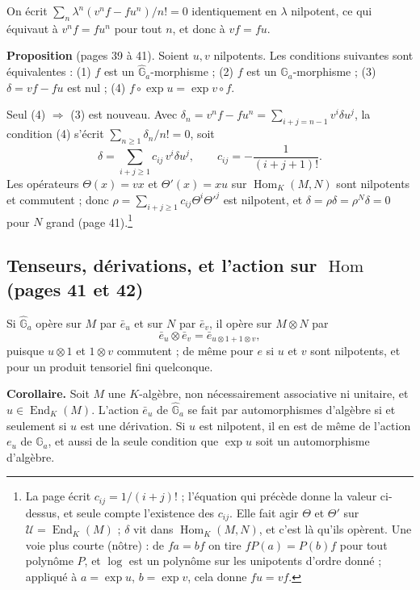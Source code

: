 \documentclass[11pt,a4paper]{article}
\begin{document}
On écrit $\sum_n \lambda^n (v^n f - f u^n)/n! = 0$ identiquement en
$\lambda$ nilpotent, ce qui équivaut à $v^n f = f u^n$ pour tout $n$, et donc
à $vf = fu$.

\textbf{Proposition} (pages 39 à 41). Soient $u, v$ nilpotents. Les
conditions suivantes sont équivalentes : (1) $f$ est un
$\widehat{\mathbb{G}}_a$-morphisme ; (2) $f$ est un
$\mathbb{G}_a$-morphisme ; (3) $\delta = vf - fu$ est nul ; (4)
$f \circ \exp u = \exp v \circ f$.

Seul (4) $\Rightarrow$ (3) est nouveau. Avec
$\delta_n = v^n f - f u^n = \sum_{i + j = n - 1} v^i \delta u^j$, la
condition (4) s'écrit $\sum_{n \geqslant 1} \delta_n / n! = 0$, soit
\[
\delta = \sum_{i + j \geqslant 1} c_{ij}\, v^i \delta u^j,
\qquad c_{ij} = -\frac{1}{(i + j + 1)!} .
\]
Les opérateurs $\Theta(x) = vx$ et $\Theta'(x) = xu$ sur
$\operatorname{Hom}_K(M, N)$ sont nilpotents et commutent ; donc
$\rho = \sum_{i+j \geqslant 1} c_{ij} \Theta^i \Theta'^j$ est nilpotent, et
$\delta = \rho\delta = \rho^N \delta = 0$ pour $N$ grand (page
41).\footnote{La page écrit $c_{ij} = 1/(i+j)!$ ; l'équation qui précède
donne la valeur ci-dessus, et seule compte l'existence des $c_{ij}$. Elle
fait agir $\Theta$ et $\Theta'$ sur $\mathcal{U} = \operatorname{End}_K(M)$ ;
$\delta$ vit dans $\operatorname{Hom}_K(M, N)$, et c'est là qu'ils opèrent.
Une voie plus courte (nôtre) : de $f a = b f$ on tire $f P(a) = P(b) f$ pour
tout polynôme $P$, et $\log$ est un polynôme sur les unipotents d'ordre
donné ; appliqué à $a = \exp u$, $b = \exp v$, cela donne $fu = vf$.}

\subsection*{Tenseurs, dérivations, et l'action sur $\operatorname{Hom}$ (pages 41 et 42)}

Si $\widehat{\mathbb{G}}_a$ opère sur $M$ par $\bar e_u$ et sur $N$ par
$\bar e_v$, il opère sur $M \otimes N$ par
\[
\bar e_u \otimes \bar e_v = \bar e_{u \otimes 1 + 1 \otimes v},
\]
puisque $u \otimes 1$ et $1 \otimes v$ commutent ; de même pour $e$ si $u$ et
$v$ sont nilpotents, et pour un produit tensoriel fini quelconque.

\textbf{Corollaire.} Soit $M$ une $K$-algèbre, non nécessairement associative
ni unitaire, et $u \in \operatorname{End}_K(M)$. L'action $\bar e_u$ de
$\widehat{\mathbb{G}}_a$ se fait par automorphismes d'algèbre si et seulement
si $u$ est une dérivation. Si $u$ est nilpotent, il en est de même de
l'action $e_u$ de $\mathbb{G}_a$, et aussi de la seule condition que
$\exp u$ soit un automorphisme d'algèbre.
\end{document}
